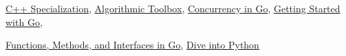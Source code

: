  \href{https://www.coursera.org/account/accomplishments/specialization/certificate/N8AWM4CRDX2N}{C++ Specialization}, \href{https://www.coursera.org/account/accomplishments/certificate/CUARBY8TDK6R}{Algorithmic Toolbox},
 \href{https://www.coursera.org/account/accomplishments/certificate/AMMT6KEVR2EG}{Concurrency in Go},
 \href{https://www.coursera.org/account/accomplishments/certificate/FAXUVYAA8EPV}{Getting Started with Go},
 
 \href{https://www.coursera.org/account/accomplishments/certificate/GJ94MMNTQJ4Q}{Functions, Methods, and Interfaces in Go},
 \href{https://www.coursera.org/account/accomplishments/certificate/SXGZUQ3JMX29}{Dive into Python}